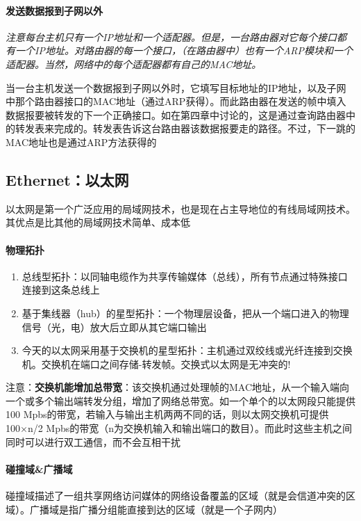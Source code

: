 \documentclass[]{report}
\begin{document}
			\paragraph{发送数据报到子网以外}
			\textit{注意每台主机只有一个IP地址和一个适配器。但是，一台路由器对它每个接口都有一个IP地址。对路由器的每一个接口，（在路由器中）也有一个ARP模块和一个适配器。当然，网络中的每个适配器都有自己的MAC地址。}\par
			当一台主机发送一个数据报到子网以外时，它填写目标地址的IP地址，以及子网中那个路由器接口的MAC地址（通过ARP获得）。而此路由器在发送的帧中填入数据报要被转发的下一个正确接口。如在第四章中讨论的，这是通过查询路由器中的转发表来完成的。转发表告诉这台路由器该数据报要走的路径。不过，下一跳的MAC地址也是通过ARP方法获得的
		\subsection{Ethernet：以太网}
		以太网是第一个广泛应用的局域网技术，也是现在占主导地位的有线局域网技术。其优点是比其他的局域网技术简单、成本低
			\paragraph{物理拓扑}
			\begin{enumerate}
				\item 总线型拓扑：以同轴电缆作为共享传输媒体（总线），所有节点通过特殊接口连接到这条总线上
				\item 基于集线器（hub）的星型拓扑：一个物理层设备，把从一个端口进入的物理信号（光，电）放大后立即从其它端口输出
				\item 今天的以太网采用基于交换机的星型拓扑：主机通过双绞线或光纤连接到交换机。交换机在端口之间存储-转发帧。交换式以太网是无冲突的!
			\end{enumerate}
			注意：\textbf{交换机能增加总带宽}：该交换机通过处理帧的MAC地址，从一个输入端向一个或多个输出端转发分组，增加了网络总带宽。如一个单个的以太网段只能提供100 Mpbs的带宽，若输入与输出主机两两不同的话，则以太网交换机可提供100×n/2 Mpbs的带宽（n为交换机输入和输出端口的数目）。而此时这些主机之间同时可以进行双工通信，而不会互相干扰
			\paragraph{碰撞域\&广播域}
			碰撞域描述了一组共享网络访问媒体的网络设备覆盖的区域（就是会信道冲突的区域）。广播域是指广播分组能直接到达的区域（就是一个子网内）
\end{document}
